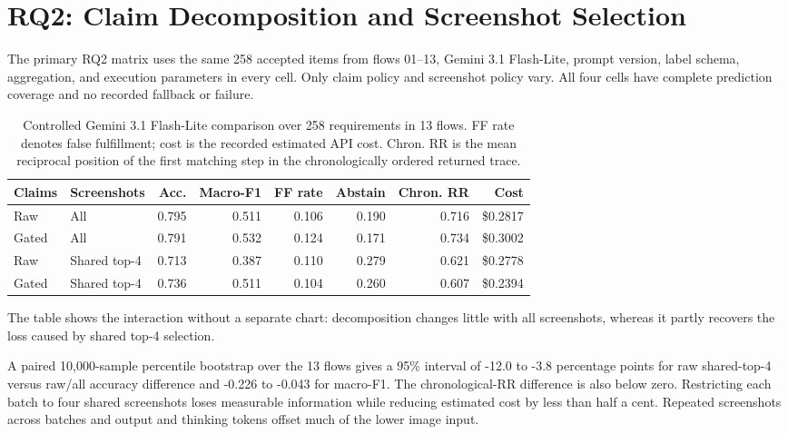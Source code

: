 \section{RQ2: Claim Decomposition and Screenshot Selection}\label{rq2-claim-decomposition-and-screenshot-selection}

The primary RQ2 matrix uses the same 258 accepted items from flows 01--13,
Gemini 3.1 Flash-Lite, prompt version, label schema, aggregation, and execution
parameters in every cell. Only claim policy and screenshot policy vary. All
four cells have complete prediction coverage and no recorded fallback or
failure.

\begin{table}[htbp]
  \centering
  \small
  \setlength{\tabcolsep}{4.2pt}
  \begin{tabular}{@{}llrrrrrr@{}}
    \toprule
    \textbf{Claims} & \textbf{Screenshots} & \textbf{Acc.} & \textbf{Macro-F1} &
    \textbf{FF rate} & \textbf{Abstain} & \textbf{Chron. RR} & \textbf{Cost} \\
    \midrule
    Raw & All & 0.795 & 0.511 & 0.106 & 0.190 & 0.716 & \$0.2817 \\
    Gated & All & 0.791 & 0.532 & 0.124 & 0.171 & 0.734 & \$0.3002 \\
    Raw & Shared top-4 & 0.713 & 0.387 & 0.110 & 0.279 & 0.621 & \$0.2778 \\
    Gated & Shared top-4 & 0.736 & 0.511 & 0.104 & 0.260 & 0.607 & \$0.2394 \\
    \bottomrule
  \end{tabular}
  \caption{Controlled Gemini 3.1 Flash-Lite comparison over 258 requirements in
  13 flows. FF rate denotes false fulfillment; cost is the recorded estimated
  API cost. Chron. RR is the mean reciprocal position of the first matching
  step in the chronologically ordered returned trace.}
  \label{tab:controlled-full-benchmark}
\end{table}

The table shows the interaction without a separate chart: decomposition changes
little with all screenshots, whereas it partly recovers the loss caused by
shared top-4 selection.

A paired 10,000-sample percentile bootstrap over the 13 flows gives a 95\%
interval of -12.0 to -3.8 percentage points for raw shared-top-4 versus raw/all
accuracy difference and -0.226 to -0.043 for macro-F1. The chronological-RR difference is
also below zero. Restricting each batch to four shared screenshots loses
measurable information while reducing estimated cost by less than half a cent.
Repeated screenshots across batches and output and thinking tokens offset much
of the lower image input.

